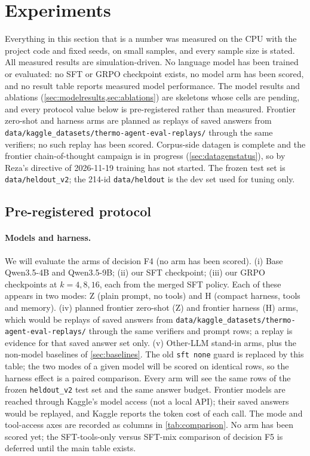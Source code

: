 \section{Experiments}\label{sec:experiments}

Everything in this section that is a number was measured on the CPU with the project code and fixed seeds, on small samples, and
every sample size is stated. All measured results are simulation-driven. No language model has been trained or evaluated: no SFT or GRPO checkpoint exists, no model arm has been scored, and no result table reports measured model performance. The model results and ablations (\cref{sec:modelresults,sec:ablations}) are skeletons whose cells are pending, and every protocol value below is pre-registered rather than measured. Frontier zero-shot and harness arms are planned as replays of saved answers from \texttt{data/kaggle\_datasets/thermo-agent-eval-replays/} through the same verifiers; no such replay has been scored. Corpus-side datagen is complete and the frontier chain-of-thought campaign is in progress (\cref{sec:datagenstatus}), so by Reza's directive of 2026-11-19 training has not started. The frozen test set is \texttt{data/heldout\_v2}; the 214-id \texttt{data/heldout} is the dev set used for tuning only.

\subsection{Pre-registered protocol}\label{sec:protocol}

\paragraph{Models and harness.}
We will evaluate the arms of decision F4 (no arm has been scored). (i) Base Qwen3.5-4B and Qwen3.5-9B; (ii) our SFT checkpoint; (iii) our GRPO checkpoints at $k=4,8,16$, each from the merged SFT policy. Each of these appears in two modes: Z (plain prompt, no tools) and H (compact harness, tools and memory). (iv) planned frontier zero-shot (Z) and frontier harness (H) arms, which would be replays of saved answers from \texttt{data/kaggle\_datasets/thermo-agent-eval-replays/} through the same verifiers and prompt rows; a replay is evidence for that saved answer set only. (v) Other-LLM stand-in arms, plus the non-model baselines of \cref{sec:baselines}. The old \texttt{sft none} guard is replaced by this table; the two modes of a given model will be scored on identical rows, so the harness effect is a paired comparison. Every arm will see the same rows of the frozen \texttt{heldout\_v2} test set and the same answer budget. Frontier models are reached through Kaggle's model access (not a local API); their saved answers would be replayed, and Kaggle reports the token cost of each call. The mode and tool-access axes are recorded as columns in \cref{tab:comparison}. No arm has been scored yet; the SFT-tools-only versus SFT-mix comparison of decision F5 is deferred until the main table exists.

